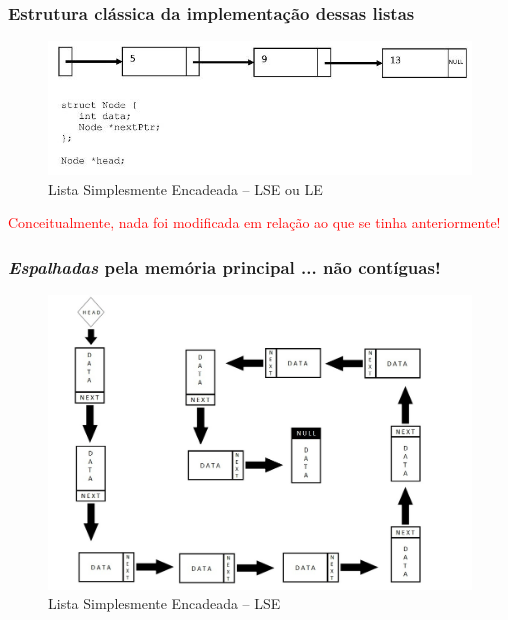 \begin{frame}%
\frametitle{Estrutura clássica  da implementação dessas listas}

\begin{figure}[!ht]
	\centering
	\includegraphics[height=0.550\paperheight, width=0.85\paperwidth]{figs/fig_listas/lista_SE_struct}
\caption{Lista Simplesmente Encadeada -- LSE ou LE}
	\end{figure} 
	
\begin{center}
	\textcolor{red}{Conceitualmente, nada foi modificada em relação ao que se tinha anteriormente!}
	\end{center}

\end{frame} 

\begin{frame}%
\frametitle{\textit{Espalhadas} pela memória principal ... não contíguas!}

\begin{figure}[!ht]
	\centering
	\includegraphics[height=0.550\paperheight, width=0.85\paperwidth]{figs/fig_listas/lista_encadeada02}
\caption{Lista Simplesmente Encadeada -- LSE}
	\end{figure} 

\end{frame} 

